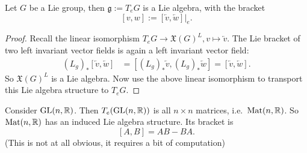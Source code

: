 \begin{prop}[A]
    Let $G$ be a Lie group, then  $\mathfrak g := T_e G$ is a Lie algebra,
    with the bracket
    \[
        [v, w] := [\overleftarrow v, \overleftarrow w]|_e
    .\] 
\end{prop}
\begin{proof}
    Recall the linear isomorphism $T_eG  \to  \mathfrak{X}(G)^{L}, v \mapsto  \overleftarrow v$.  The Lie bracket of two left invariant vector fields is again a left invariant vector field:
    \begin{align*}
        (L_g)_*[\overleftarrow v, \overleftarrow w] &= [ (L_g)_* \overleftarrow v, (L_g)_* \overleftarrow w]
                                                    = [\overleftarrow v, \overleftarrow w]
    .\end{align*}
    So $\mathfrak{X}(G)^{L}$ is a Lie algebra. Now use the above linear isomorphism to transport this Lie algebra structure to $T_eG$.
\end{proof}

\begin{eg}
    Consider $\operatorname{GL}(n, \mathbb{R})$.
    Then $T_e (\operatorname{GL}(n, \mathbb{R}))$ is all $n \times n$ matrices, i.e.\ $\operatorname{Mat} (n, \mathbb{R})$. So $\operatorname{Mat} (n, \mathbb{R})$ has an induced Lie algebra structure.  Its bracket is
    \[
        [A, B] = AB - BA
    .\] 
    (This is not at all obvious, it requires a bit of computation)
\end{eg}
